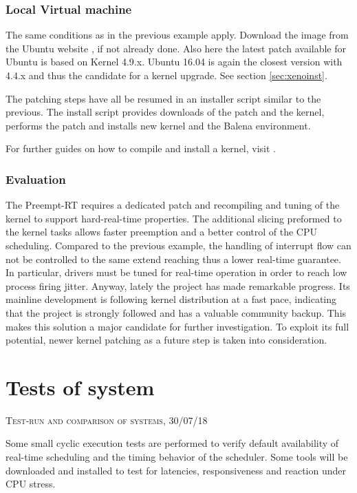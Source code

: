 \documentclass[]{scrartcl}
\begin{document}
\subsubsection{Local Virtual machine}

The same conditions as in the previous example apply. Download the image from the Ubuntu website \cite{ubuntu02}, if not already done. Also here the latest patch available for Ubuntu is based on Kernel 4.9.x. Ubuntu 16.04 is again the closest version with 4.4.x and thus the candidate for a kernel upgrade. See section \ref{sec:xenoinst}.

The patching steps have all be resumed in an installer script similar to the previous. The install script provides downloads of the patch and the kernel, performs the patch and installs new kernel and the Balena environment.

For further guides on how to compile and install a kernel, visit \cite{misc01}.

\subsubsection{Evaluation}

The Preempt-RT requires a dedicated patch and recompiling and tuning of the kernel to support hard-real-time properties. The additional slicing preformed to the kernel tasks allows faster preemption and a better control of the CPU scheduling. Compared to the previous example, the handling of interrupt flow can not be controlled to the same extend reaching thus a lower real-time guarantee. In particular, drivers must be tuned for real-time operation in order to reach low process firing jitter. Anyway, lately the project has made remarkable progress.
Its mainline development is following kernel distribution at a fast pace, indicating that the project is strongly followed and has a valuable community backup. This makes this solution a major candidate for further investigation.
To exploit its full potential, newer kernel patching as a future step is taken into consideration.

\section{Tests of system}

{\small\textsc{Test-run and comparison of systems, 30/07/18} \bigskip}

Some small cyclic execution tests are performed to verify default availability of real-time scheduling and the timing behavior of the scheduler. Some tools will be downloaded and installed to test for latencies, responsiveness and reaction under CPU stress. 
\end{document}
